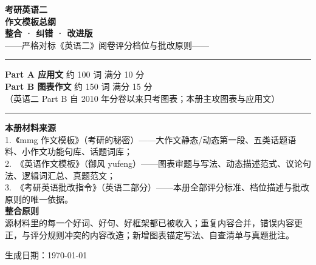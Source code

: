 \documentclass[11pt,a4paper]{ctexart}
\begin{document}
\begin{titlepage}
\centering
\vspace*{2.2cm}

{\fontsize{30}{38}\selectfont\bfseries\color{accent} 考研英语二}\\[10pt]
{\fontsize{30}{38}\selectfont\bfseries\color{accent} 作文模板总纲}\\[18pt]

{\large\bfseries 整合 · 纠错 · 改进版}\\[6pt]
{\normalsize\color{mid} ——严格对标《英语二》阅卷评分档位与批改原则——}

\vspace{1.4cm}
\noindent\rule{\linewidth}{1pt}
\vspace{0.6cm}

\begin{minipage}{0.86\linewidth}
\centering
\large
\textbf{Part A 应用文} \quad 约 100 词 \quad 满分 10 分\\[4pt]
\textbf{Part B 图表作文} \quad 约 150 词 \quad 满分 15 分\\[10pt]
\normalsize\color{mid}
（英语二 Part B 自 2010 年分卷以来只考图表；本册主攻图表与应用文）
\end{minipage}

\vspace{1.0cm}
\noindent\rule{\linewidth}{1pt}
\vspace{0.8cm}

\begin{minipage}{0.88\linewidth}
\small
\textbf{本册材料来源}\\[4pt]
1.\ 《mmg 作文模板》（考研的秘密）——大作文静态/动态第一段、五类话题语料、小作文功能句库、话题词库；\\
2.\ 《英语作文模板》（御风 yufeng）——图表审题与写法、动态描述范式、议论句法、逻辑词汇总、真题范文；\\
3.\ 《考研英语批改指令》（英语二部分）——本册全部评分标准、档位描述与批改原则的唯一依据。\\[8pt]
\textbf{整合原则}\\[4pt]
源材料里的每一个好词、好句、好框架都已被收入；重复内容合并，错误内容更正，与评分规则冲突的内容改造；新增图表锚定写法、自查清单与真题批注。
\end{minipage}

\vfill
{\small\color{mid} 生成日期：\today}
\end{titlepage}

\renewcommand{\contentsname}{目\quad 录}
\tableofcontents
\clearpage
{}
\end{document}
